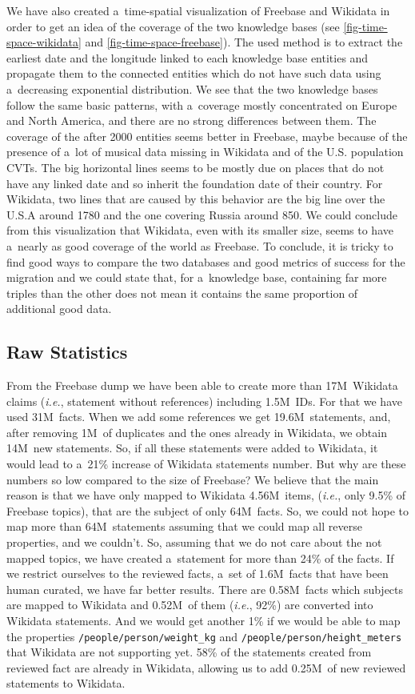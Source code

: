 \documentclass{sig-alternate}
\begin{document}
We have also created a~time-spatial visualization of Freebase and Wikidata in order
to get an idea of the coverage of the two knowledge bases
(see \autoref{fig-time-space-wikidata} and \autoref{fig-time-space-freebase}).
The used method is to extract the earliest date and the longitude
linked to each knowledge base entities
and propagate them to the connected entities which do not have such data
using a~decreasing exponential distribution.
We see that the two knowledge bases follow the same basic patterns,
with a~coverage mostly concentrated on Europe and North America,
and there are no strong differences between them.
The coverage of the after 2000 entities seems better in Freebase, maybe because of
the presence of a~lot of musical data missing in Wikidata and of the U.S.
population CVTs.
The big horizontal lines seems to be mostly due on places that do not have any linked date
and so inherit the foundation date of their country.
For Wikidata, two lines that are caused by this behavior are the big line over the U.S.A around 1780
and the one covering Russia around 850.
We could conclude from this visualization that Wikidata, even with its smaller size,
seems to have a~nearly as good coverage of the world as Freebase.
To conclude, it is tricky to find good ways to compare the two databases
and good metrics of success for the migration and we could state that, for a~knowledge base,
containing far more triples than the other does not mean
it contains the same proportion of additional good data.

\subsection{Raw Statistics}

From the Freebase dump we have been able to create more than 17M~Wikidata claims
(\emph{i.e.}, statement without references) including 1.5M~IDs.
For that we have used 31M~facts.
When we add some references we get 19.6M~statements, and, after removing 1M~of duplicates
and the ones already in Wikidata, we obtain 14M~new statements.
So, if all these statements were added to Wikidata,
it would lead to a~21\% increase of Wikidata statements number.
But why are these numbers so low compared to the size of Freebase?
We believe that the main reason is that we have only mapped to Wikidata 4.56M~items, (\emph{i.e.},
only 9.5\% of Freebase topics), that are the subject of only 64M~facts.
So, we could not hope to map more than 64M~statements
assuming that we could map all reverse properties, and we couldn't.
So, assuming that we do not care about the not mapped topics,
we have created a~statement for more than 24\% of the facts.
If we restrict ourselves to the reviewed facts, a~set of 1.6M~facts
that have been human curated, we have far better results.
There are 0.58M~facts which subjects are mapped to Wikidata and 0.52M~of them
(\emph{i.e.}, 92\%) are converted into Wikidata statements.
And we would get another 1\% if we would be able
to map the properties \texttt{/people/person/weight\_kg}
and \texttt{/people/person/height\_meters} that Wikidata are not supporting yet.
58\% of the statements created from reviewed fact are already in Wikidata,
allowing us to add 0.25M~of new reviewed statements to Wikidata.
\end{document}
